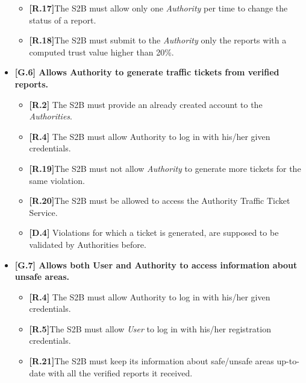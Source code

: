 \begin{itemize}
\begin{itemize}
        
        \item \textbf{[R.17]}The S2B must allow only one \textit{Authority} per time to change the status of a report.
        
        \item \textbf{[R.18]}The S2B must submit to the \textit{Authority} only the reports with a computed trust value higher than 20\%.
        
    \end{itemize}
    
    
\item \textbf{{[G.6]} Allows Authority to generate traffic tickets from verified reports.}

    \begin{itemize}
    
        \item \textbf{[R.2]} The S2B must provide an already created account to the \textit{Authorities}.
        
          \item \textbf{[R.4]} The S2B must allow Authority to log in with his/her given credentials.
        
         \item \textbf{[R.19]}The S2B must not allow \textit{Authority} to generate more tickets for the same violation.
         
         \item \textbf{[R.20]}The S2B must be allowed to access the Authority Traffic Ticket Service.
         
        \item \textbf{[D.4]} Violations for which a ticket is generated, are supposed to be validated by Authorities before.
        
    \end{itemize}


\item \textbf{{[G.7]} Allows both User and Authority to access information about unsafe areas.}
    \begin{itemize}
    
 \item \textbf{[R.4]} The S2B must allow Authority to log in with his/her given credentials.
        
        
        \item \textbf{[R.5]}The S2B must allow \textit{User} to log in with his/her registration credentials.
        
        \item \textbf{[R.21]}The S2B must keep its information about safe/unsafe areas up-to-date with all the verified reports it received.
    \end{itemize}
    

\end{itemize}
